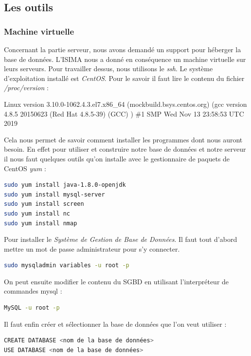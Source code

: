 \subsection{Les outils}
\subsubsection{Machine virtuelle}
Concernant la partie serveur, nous avons demandé un support pour héberger la base de données. L'ISIMA nous a donné en conséquence un machine
virtuelle sur leurs serveurs. Pour travailler dessus, nous utilisons le \emph{ssh}. Le système d'exploitation installé est \emph{CentOS}.
Pour le savoir il faut lire le contenu du fichier \emph{/proc/version} :
\begin{mdframed}[backgroundcolor=light-gray, roundcorner=20pt,
    leftmargin=0, rightmargin=0, 
    innerleftmargin=20, linecolor=darkgray]
    Linux version 3.10.0-1062.4.3.el7.x86\_64 (mockbuild\@kbuilder.bsys.centos.org) (gcc version 4.8.5 20150623 (Red Hat 4.8.5-39) (GCC) ) \#1 SMP Wed Nov 13 23:58:53 UTC 2019
\end{mdframed}

Cela nous permet de savoir comment installer les programmes dont nous auront besoin. En effet pour utiliser et construire notre base de données
et notre serveur il nous faut quelques outils qu'on installe avec le gestionnaire de paquets de CentOS \emph{yum} :
\begin{lstlisting}[language=bash]
sudo yum install java-1.8.0-openjdk
sudo yum install mysql-server
sudo yum install screen
sudo yum install nc
sudo yum install nmap
\end{lstlisting}

Pour installer le \emph{Système de Gestion de Base de Données}. Il faut tout d'abord mettre un mot de passe administrateur
pour s'y connecter.
\begin{lstlisting}[language=bash]
sudo mysqladmin variables -u root -p
\end{lstlisting}
On peut ensuite modifier le contenu du SGBD en utilisant l'interpréteur de commandes mysql :
\begin{lstlisting}[language=bash]
MySQL -u root -p
\end{lstlisting}
Il faut enfin créer et sélectionner la base de données que l'on veut utiliser :
\begin{lstlisting}[language=bash]
CREATE DATABASE <nom de la base de données>
USE DATABASE <nom de la base de données>
\end{lstlisting}


